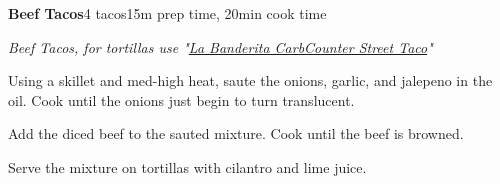 \documentclass[../recipe-collections/cooking.tex]{subfiles}
\begin{document}
\begin{recipe}{\textbf{Beef Tacos}}{4 tacos}{15m prep time, 20min cook time}
  
  \freeform{}\textit{Beef Tacos, for tortillas use "\href{https://www.kroger.com/p/la-banderita-carbcounter-street-taco-flour-tortillas/0002733103317?fulfillment=SHIP&searchType=default_search}{La Banderita CarbCounter Street Taco}"}


  Using a skillet and med-high heat, saute the onions, garlic, and jalepeno in the oil. Cook until 
  the onions just begin to turn translucent. 


  Add the diced beef to the sauted mixture. Cook until the beef is browned.


  Serve the mixture on tortillas with cilantro and lime juice.
  
  \freeform{}\hrulefill{}

\end{recipe}
\end{document}
